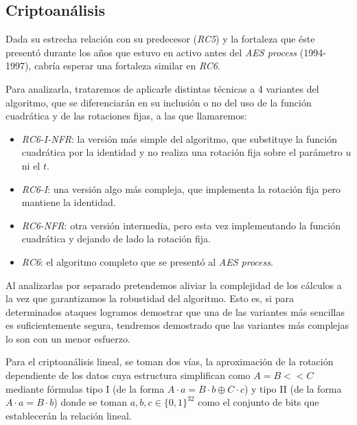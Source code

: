 \subsection{Criptoanálisis}
	Dada su estrecha relación con su predecesor (\textit{RC5}) y la fortaleza que éste presentó durante los años que estuvo en activo antes del \textit{AES process} (1994-1997), cabría esperar una fortaleza similar en \textit{RC6}. \cite{RC6_Crypt}
	
	Para analizarla, trataremos de aplicarle distintas técnicas a 4 variantes del algoritmo, que se diferenciarán en su inclusión o no del uso de la función cuadrática y de las rotaciones fijas, a las que llamaremos:
	\begin{itemize}
		\item \textit{RC6-I-NFR}: la versión más simple del algoritmo, que substituye la función cuadrática por la identidad y no realiza una rotación fija sobre el parámetro $u$ ni el $t$.
		\item \textit{RC6-I}: una versión algo más compleja, que implementa la rotación fija pero mantiene la identidad.
		\item \textit{RC6-NFR}: otra versión intermedia, pero esta vez implementando la función cuadrática y dejando de lado la rotación fija.
		\item \textit{RC6}: el algoritmo completo que se presentó al \textit{AES process}.
	\end{itemize}

	Al analizarlas por separado pretendemos aliviar la complejidad de los cálculos a la vez que garantizamos la robustidad del algoritmo. Esto es, si para determinados ataques logramos demostrar que una de las variantes más sencillas es suficientemente segura, tendremos demostrado que las variantes más complejas lo son con un menor esfuerzo.
	
	Para el criptoanálisis lineal, se toman dos vías, la aproximación de la rotación dependiente de los datos cuya estructura simplifican como $A = B << C$ mediante fórmulas tipo I (de la forma $A \cdot a = B \cdot b \oplus C \cdot c$) y tipo II (de la forma $A \cdot a = B \cdot b$) donde se toman $a, b, c \in \{0, 1\}^{32}$ como el conjunto de bits que establecerán la relación lineal.
	
